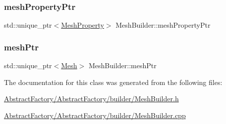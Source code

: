 \mbox{\label{class_mesh_builder_a0c1493d189b81576c0740cc9a9373dc1}} 
\subsubsection{\texorpdfstring{meshPropertyPtr}{meshPropertyPtr}}
{\footnotesize\ttfamily std\+::unique\+\_\+ptr$<$\mbox{\hyperlink{class_mesh_property}{Mesh\+Property}}$>$ Mesh\+Builder\+::mesh\+Property\+Ptr}

\mbox{\label{class_mesh_builder_ad15d79cf6c25b3381e4628f77adc099a}} 
\subsubsection{\texorpdfstring{meshPtr}{meshPtr}}
{\footnotesize\ttfamily std\+::unique\+\_\+ptr$<$\mbox{\hyperlink{class_mesh}{Mesh}}$>$ Mesh\+Builder\+::mesh\+Ptr}



The documentation for this class was generated from the following files\+:\begin{DoxyCompactItemize}
\item 
\mbox{\hyperlink{_abstract_factory_2_abstract_factory_2builder_2_mesh_builder_8h}{Abstract\+Factory/\+Abstract\+Factory/builder/\+Mesh\+Builder.\+h}}\item 
\mbox{\hyperlink{_abstract_factory_2_abstract_factory_2builder_2_mesh_builder_8cpp}{Abstract\+Factory/\+Abstract\+Factory/builder/\+Mesh\+Builder.\+cpp}}\end{DoxyCompactItemize}
